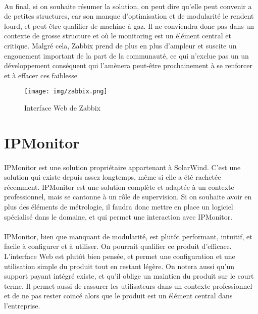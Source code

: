 \documentclass[a4paper,12pt]{report}
\begin{document}
\paragraph{}
Au final, si on souhaite résumer la solution, on peut dire qu'elle peut convenir a de petites structures, car son manque d'optimisation et de modularité le rendent lourd, et peut être qualifier de \og machine à gaz\fg. Il ne conviendra donc pas dans un contexte de grosse structure et où le monitoring est un élément central et critique. Malgré cela, Zabbix prend de plus en plus d'ampleur et suscite un engouement important de la part de la communauté, ce qui n'exclue pas un un développement conséquent qui l'amènera peut-être prochainement à se renforcer et à effacer ces faiblesse

\begin{figure}[!h]
  \texttt{[image: img/zabbix.png]}
  \caption{Interface Web de Zabbix}
\end{figure}

\section{IPMonitor}

\paragraph{}
IPMonitor est une solution propriétaire appartenant à SolarWind. C'est une solution qui existe depuis assez longtemps, même si elle a été rachetée récemment. IPMonitor est une solution complète et adaptée à un contexte professionnel, mais se cantonne à un rôle de supervision. Si on souhaite avoir en plus des éléments de métrologie, il faudra donc mettre en place un logiciel spécialisé dans le domaine, et qui permet une interaction avec IPMonitor.

\paragraph{}
IPMonitor, bien que manquant de modularité, est plutôt performant, intuitif, et facile à configurer et à utiliser.
On pourrait qualifier ce produit d'efficace. L'interface Web est plutôt bien pensée, et permet une configuration et une utilisation simple du produit tout en restant légère. On notera aussi qu'un support payant intégré existe, et qu'il oblige un maintien du produit sur le court terme. Il permet aussi de rassurer les utilisateurs dans un contexte professionnel et de ne pas rester coincé alors que le produit est un élément central dans l'entreprise.
\end{document}
